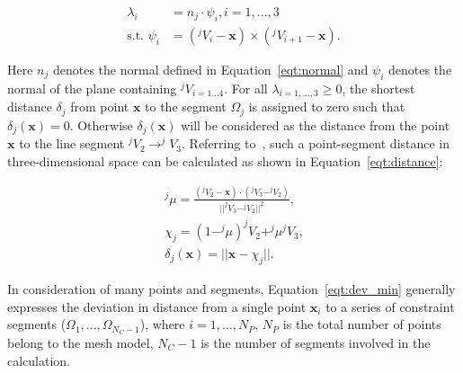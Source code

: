 \begin{equation}
\begin{aligned}
\lambda_i &= n_j \cdot \psi_i, i={1,...,3} \\
\mbox{s.t. } \psi_i &= (^jV_i-\textbf{x}) \times (^jV_{i+1}-\textbf{x}) \mbox{.}
\end{aligned}
\label{eqt:lamda}
\end{equation}

Here $n_j$ denotes the normal defined in Equation~\ref{eqt:normal} and $\psi_i$ denotes the normal of the plane containing $^jV_{i=1...4}$.
For all $\lambda_{i=1,...,3} \ge 0$, the shortest distance $\delta_j$ from point $\textbf{x}$ to the segment $\Omega_j$ is assigned to zero such that $\delta_j(\textbf{x})=0$.
Otherwise $\delta_j(\textbf{x})$ will be considered as the distance from the point $\textbf{x}$ to the line segment $^jV_2 \rightarrow ^jV_3$.
Referring to~\cite{weisstein}, such a point-segment distance in three-dimensional space can be calculated as shown in Equation~\ref{eqt:distance}:

\begin{equation}
\begin{aligned}
^j\mu = \frac{(^jV_2-\textbf{x})\cdot(^jV_3-^jV_2)}{||^jV_3-^jV_2||^2} \mbox{,} \\
\chi_j = (1-^j\mu)^jV_2 + ^j\mu^jV_3 \mbox{,} \\
\delta_{j}(\textbf{x}) = ||\textbf{x}-\chi_j|| \mbox{.}
\end{aligned}
\label{eqt:distance}
\end{equation}

In consideration of many points and segments, Equation~\ref{eqt:dev_min} generally expresses the deviation in distance from a single point $\textbf{x}_i$ to a series of constraint segments ($\Omega_{1},...,\Omega_{N_C-1}$), where $i=1,...,N_P$, $N_P$ is the total number of points belong to the mesh model, $N_C-1$ is the number of segments involved in the calculation.



